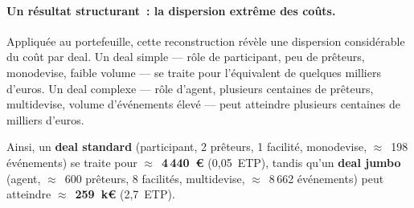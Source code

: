 \paragraph{Un résultat structurant~: la dispersion extrême des coûts.}
Appliquée au portefeuille, cette reconstruction révèle une dispersion considérable du coût par deal. Un deal simple --- rôle de participant, peu de prêteurs, monodevise, faible volume --- se traite pour l'équivalent de quelques milliers d'euros. Un deal complexe --- rôle d'agent, plusieurs centaines de prêteurs, multidevise, volume d'événements élevé --- peut atteindre plusieurs centaines de milliers d'euros.

Ainsi, un \textbf{deal standard} (participant, 2 prêteurs, 1 facilité, monodevise, $\approx$~198 événements) se traite pour $\approx$~\textbf{4\,440~€} (0,05~ETP), tandis qu'un \textbf{deal jumbo} (agent, $\approx$~600 prêteurs, 8 facilités, multidevise, $\approx$~8\,662 événements) peut atteindre $\approx$~\textbf{259~k€} (2,7~ETP).

